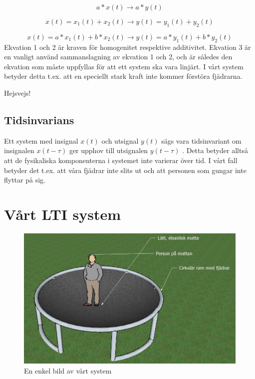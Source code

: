 \documentclass[10pt,a4paper]{article}
\begin{document}
\begin{equation}
a*x(t) \rightarrow a*y(t) 
\end{equation}

\begin{equation}
x(t) = x_1(t) + x_2(t) \rightarrow y(t) = y_1(t) + y_2(t)
\end{equation}

\begin{equation}
x(t) = a*x_1(t) + b*x_2(t)\rightarrow y(t) = a*y_1(t) + b*y_2(t)
\end{equation}
\linebreak
Ekvation 1 och 2 är kraven för homogenitet respektive additivitet. Ekvation 3 är en vanligt använd sammanslagning av ekvation 1 och 2, och är således den ekvation som måste uppfyllas för att ett system ska vara linjärt. \cite{sune2000}
I vårt system betyder detta t.ex. att en speciellt stark kraft inte kommer förstöra fjädrarna.

Hejsvejs!


\subsection{Tidsinvarians}


Ett system med insignal $x(t)$ och utsignal $y(t)$ sägs vara tidsinvariant om insignalen $x(t - \tau)$ ger upphov till utsignalen $y(t - \tau)$ \cite{sune2000}. Detta betyder alltså att de fysikaliska komponenterna i systemet inte varierar över tid. I vårt fall betyder det t.ex. att våra fjädrar inte slits ut och att personen som gungar inte flyttar på sig. 

\newpage
\section{Vårt LTI system}

\begin{figure}[ht]
\caption{En enkel bild av vårt system}
\includegraphics[scale=0.8]{Bild2}
\end{figure}
\clearpage
\end{document}
